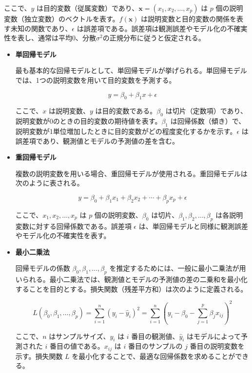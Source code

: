 ここで、$y$ は目的変数（従属変数）であり、$\mathbf{x} = (x_1, x_2, \ldots, x_p)$ は $p$ 個の説明変数（独立変数）のベクトルを表す。$f(\mathbf{x})$ は説明変数と目的変数の関係を表す未知の関数であり、$\epsilon$ は誤差項である。誤差項は観測誤差やモデル化の不確実性を表し、通常は平均0、分散$\sigma^2$の正規分布に従うと仮定される。
\begin{itemize}
\item \textbf{単回帰モデル}

最も基本的な回帰モデルとして、単回帰モデルが挙げられる。単回帰モデルでは、1つの説明変数を用いて目的変数を予測する。

\begin{equation}
	y = \beta_0 + \beta_1 x + \epsilon
\end{equation}

ここで、$x$ は説明変数、$y$ は目的変数である。$\beta_0$ は切片（定数項）であり、説明変数が0のときの目的変数の期待値を表す。$\beta_1$ は回帰係数（傾き）で、説明変数が1単位増加したときに目的変数がどの程度変化するかを示す。$\epsilon$ は誤差項であり、観測値とモデルの予測値の差を含む。

\item \textbf{重回帰モデル}

複数の説明変数を用いる場合、重回帰モデルが使用される。重回帰モデルは次のように表される。

\begin{equation}
	y = \beta_0 + \beta_1 x_1 + \beta_2 x_2 + \cdots + \beta_p x_p + \epsilon
\end{equation}

ここで、$x_1, x_2, \ldots, x_p$ は $p$ 個の説明変数、$\beta_0$ は切片、$\beta_1, \beta_2, \ldots, \beta_p$ は各説明変数に対する回帰係数である。誤差項 $\epsilon$ は、単回帰モデルと同様に観測誤差やモデル化の不確実性を表す。

\item \textbf{最小二乗法}

回帰モデルの係数 $\beta_0, \beta_1, \ldots, \beta_p$ を推定するためには、一般に最小二乗法が用いられる。最小二乗法では、観測値とモデルの予測値の差の二乗和を最小化することを目的とする。損失関数（残差平方和）は次のように定義される。

\begin{equation}
	L(\beta_0, \beta_1, \ldots, \beta_p) = \sum_{i=1}^{n} (y_i - \hat{y}_i)^2 = \sum_{i=1}^{n} (y_i - \beta_0 - \sum_{j=1}^{p} \beta_j x_{ij})^2
\end{equation}

ここで、$n$ はサンプルサイズ、$y_i$ は $i$ 番目の観測値、$\hat{y}_i$ はモデルによって予測された $i$ 番目の値である。$x_{ij}$ は $i$ 番目のサンプルの $j$ 番目の説明変数を示す。損失関数 $L$ を最小化することで、最適な回帰係数を求めることができる。


\end{itemize}
